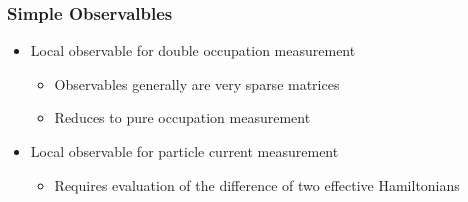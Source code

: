     \begin{frame}[t]
        \frametitle{Simple Observalbles}

        \begin{itemize}
            \item Local observable for double occupation measurement \pause
            \begin{itemize}
                \item Observables generally are very sparse matrices
                \item Reduces to pure occupation measurement
            \end{itemize}
        \end{itemize}


        \pause
        \begin{itemize}
            \item Local observable for particle current measurement \pause
            \begin{itemize}
                \item Requires evaluation of the difference of two effective Hamiltonians
            \end{itemize}
        \end{itemize}


        \onslide %
    \end{frame}

